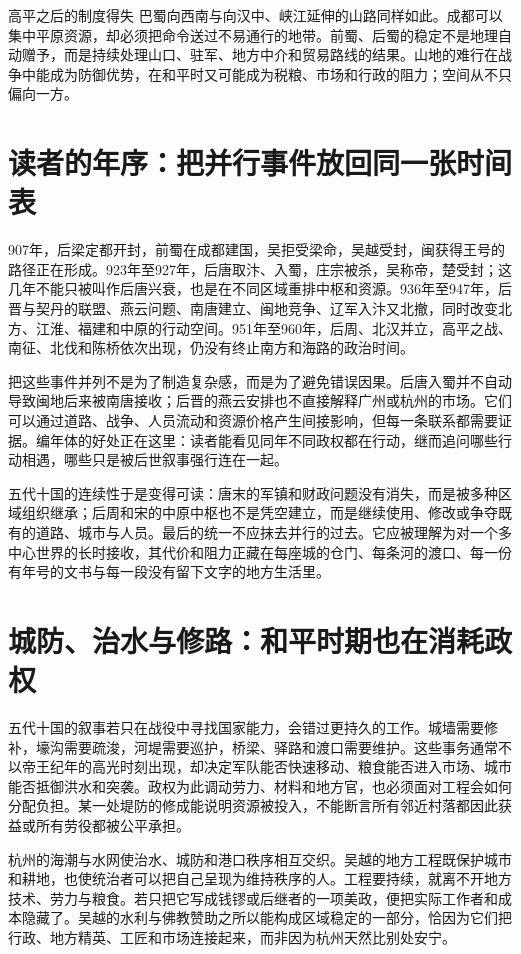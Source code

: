 \begin{causalchain}{高平之后的制度得失}
巴蜀向西南与向汉中、峡江延伸的山路同样如此。成都可以集中平原资源，却必须把命令送过不易通行的地带。前蜀、后蜀的稳定不是地理自动赠予，而是持续处理山口、驻军、地方中介和贸易路线的结果。山地的难行在战争中能成为防御优势，在和平时又可能成为税粮、市场和行政的阻力；空间从不只偏向一方。

\section{读者的年序：把并行事件放回同一张时间表}

907年，后梁定都开封，前蜀在成都建国，吴拒受梁命，吴越受封，闽获得王号的路径正在形成。923年至927年，后唐取汴、入蜀，庄宗被杀，吴称帝，楚受封；这几年不能只被叫作后唐兴衰，也是在不同区域重排中枢和资源。936年至947年，后晋与契丹的联盟、燕云问题、南唐建立、闽地竞争、辽军入汴又北撤，同时改变北方、江淮、福建和中原的行动空间。951年至960年，后周、北汉并立，高平之战、南征、北伐和陈桥依次出现，仍没有终止南方和海路的政治时间。

把这些事件并列不是为了制造复杂感，而是为了避免错误因果。后唐入蜀并不自动导致闽地后来被南唐接收；后晋的燕云安排也不直接解释广州或杭州的市场。它们可以通过道路、战争、人员流动和资源价格产生间接影响，但每一条联系都需要证据。编年体的好处正在这里：读者能看见同年不同政权都在行动，继而追问哪些行动相遇，哪些只是被后世叙事强行连在一起。

五代十国的连续性于是变得可读：唐末的军镇和财政问题没有消失，而是被多种区域组织继承；后周和宋的中原中枢也不是凭空建立，而是继续使用、修改或争夺既有的道路、城市与人员。最后的统一不应抹去并行的过去。它应被理解为对一个多中心世界的长时接收，其代价和阻力正藏在每座城的仓门、每条河的渡口、每一份有年号的文书与每一段没有留下文字的地方生活里。

\section{城防、治水与修路：和平时期也在消耗政权}

五代十国的叙事若只在战役中寻找国家能力，会错过更持久的工作。城墙需要修补，壕沟需要疏浚，河堤需要巡护，桥梁、驿路和渡口需要维护。这些事务通常不以帝王纪年的高光时刻出现，却决定军队能否快速移动、粮食能否进入市场、城市能否抵御洪水和突袭。政权为此调动劳力、材料和地方官，也必须面对工程会如何分配负担。某一处堤防的修成能说明资源被投入，不能断言所有邻近村落都因此获益或所有劳役都被公平承担。

杭州的海潮与水网使治水、城防和港口秩序相互交织。吴越的地方工程既保护城市和耕地，也使统治者可以把自己呈现为维持秩序的人。工程要持续，就离不开地方技术、劳力与粮食。若只把它写成钱镠或后继者的一项美政，便把实际工作者和成本隐藏了。吴越的水利与佛教赞助之所以能构成区域稳定的一部分，恰因为它们把行政、地方精英、工匠和市场连接起来，而非因为杭州天然比别处安宁。


\end{causalchain}
